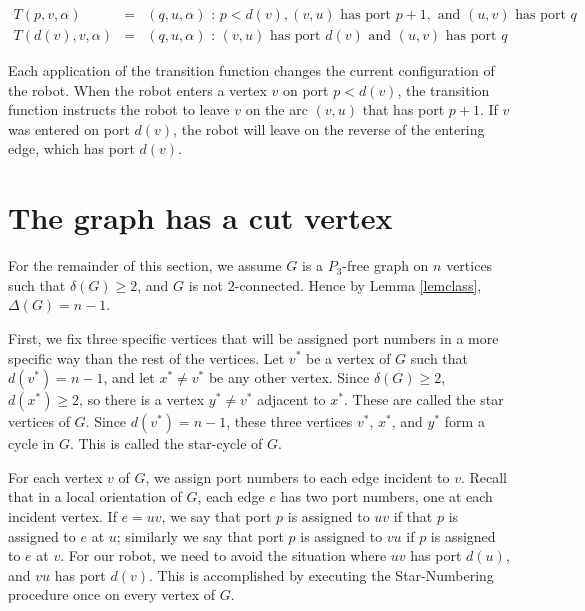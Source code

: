 \documentclass[12pt,letterpaper,oneside]{book}
\begin{document}
\begin{eqnarray*}
T(p,v,\alpha)    &=& (q,u,\alpha) \mbox{ : } p < d(v), (v,u) \mbox{ has port }p+1, \mbox{ and } (u,v) \mbox{ has port } q\\
T(d(v),v,\alpha) &=& (q,u,\alpha) \mbox{ : } (v,u) \mbox{ has port } d(v)\mbox{ and } (u,v) \mbox{ has port } q
\end{eqnarray*}

Each application of the transition function changes the current configuration of the robot.  
When the robot enters a vertex $v$ on port $p<d(v)$, the transition function instructs the robot to leave $v$ on the 
arc $(v,u)$ that has port $p+1$.  If $v$ was entered on port $d(v)$, the robot will leave on the reverse of the entering edge, 
which has port $d(v)$.  

\newpage
\section{The graph has a cut vertex}
\label{sec:cut}


For the remainder of this section, we assume $G$ is a $P_3$-free graph on $n$ vertices such that $\delta(G)\ge 2$, and $G$ is 
not $2$-connected.  
Hence by Lemma \ref{lemclass}, $\Delta(G)=n-1$.  

First, we fix three 
specific vertices that will be assigned port numbers in a more specific way than the rest of the vertices.  
Let $v^*$ be a vertex of $G$ such that $d(v^*)=n-1$, and let $x^*\ne v^*$ be any other vertex.  Since $\delta(G)\ge 2$, $d(x^*)\ge 2$, so there 
is a vertex $y^*\ne v^*$ adjacent to $x^*$.  These are called the star vertices of $G$.  Since $d(v^*)=n-1$, 
these three vertices $v^*$, $x^*$, and $y^*$ form a cycle in $G$.  This is called the star-cycle of $G$.  

For each vertex $v$ of $G$, 
we assign port numbers to each edge incident to $v$.  Recall that in a local orientation of $G$, each edge $e$ has two port numbers, one at 
each incident vertex.  If $e=uv$, we say that port $p$ is assigned to $uv$ if that $p$ is assigned to $e$ at $u$; 
similarly we say that port $p$ is assigned to $vu$ if $p$ is assigned to $e$ at $v$.  
For our robot, we need to avoid the situation where $uv$ has port $d(u)$, and $vu$ has port $d(v)$.  
This is accomplished by executing the Star-Numbering procedure once on 
every vertex of $G$.  
\end{document}
